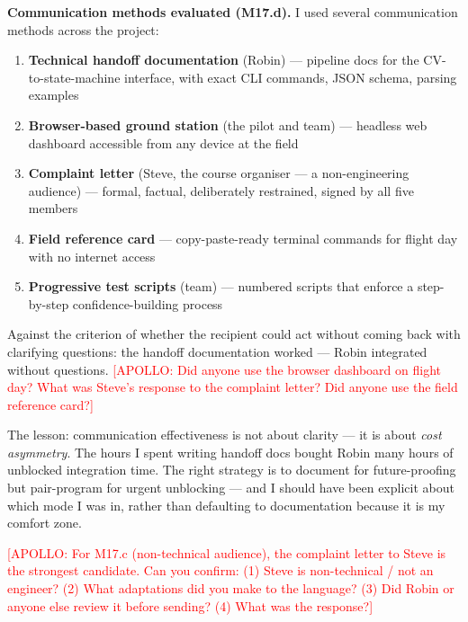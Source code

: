 \textbf{Communication methods evaluated (M17.d).} I used several communication methods across the project:

\begin{enumerate}[nosep]
\item \textbf{Technical handoff documentation} (Robin) --- pipeline docs for the CV-to-state-machine interface, with exact CLI commands, JSON schema, parsing examples
\item \textbf{Browser-based ground station} (the pilot and team) --- headless web dashboard accessible from any device at the field
\item \textbf{Complaint letter} (Steve, the course organiser --- a non-engineering audience) --- formal, factual, deliberately restrained, signed by all five members
\item \textbf{Field reference card} --- copy-paste-ready terminal commands for flight day with no internet access
\item \textbf{Progressive test scripts} (team) --- numbered scripts that enforce a step-by-step confidence-building process
\end{enumerate}

Against the criterion of whether the recipient could act without coming back with clarifying questions: the handoff documentation worked --- Robin integrated without questions. \textcolor{red}{[APOLLO: Did anyone use the browser dashboard on flight day? What was Steve's response to the complaint letter? Did anyone use the field reference card?]}

The lesson: communication effectiveness is not about clarity --- it is about \textit{cost asymmetry}. The hours I spent writing handoff docs bought Robin many hours of unblocked integration time. The right strategy is to document for future-proofing but pair-program for urgent unblocking --- and I should have been explicit about which mode I was in, rather than defaulting to documentation because it is my comfort zone.

\textcolor{red}{[APOLLO: For M17.c (non-technical audience), the complaint letter to Steve is the strongest candidate. Can you confirm: (1) Steve is non-technical / not an engineer? (2) What adaptations did you make to the language? (3) Did Robin or anyone else review it before sending? (4) What was the response?]}


